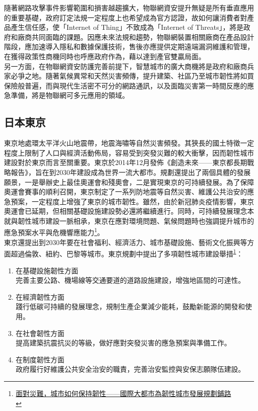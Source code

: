 \documentclass[a4paper,12pt]{article}
\begin{document}
\begin{enumerate}
隨著網路攻擊事件影響範圍和損害越趨擴大，物聯網資安提升無疑是所有垂直應用的重要基礎，政府訂定法規一定程度上也希望成為官方認證，故如何讓消費者對產品產生信任感，使「Internet of Thing」不致成為「Internet of Threats」，將是政府和廠商共同面臨的課題。因應未來法規和趨勢，物聯網裝置相關廠商在產品設計階段，應加速導入隱私和數據保護技術，售後亦應提供定期遠端漏洞維護和管理，在獲得政策性商機同時也呼應政府作為，藉以達到產官雙贏局面。\\

另一方面，在物聯網資安防護完善前提下，智慧城市的廣大商機將是政府和廠商兵家必爭之地。隨著氣候異常和天然災害頻傳，提升建築、社區乃至城市韌性將如買保險般普遍，而與現代生活密不可分的網路通訊，以及面臨災害第一時間反應的應急準備，將是物聯網可多元應用的領域。\\
\end{enumerate}

\subsection{日本東京}
\label{sec:org9cc0309}
東京地處環太平洋火山地震帶，地震海嘯等自然災害頻發。其狹長的國土特徵一定程度上限制了人口與經濟活動佈局，容易受到突發災難的較大衝擊，因而韌性城市建設對於東京而言至關重要。東京於2014年12月發佈《創造未來——東京都長期戰略報告》，旨在到2030年建設成為世界一流大都市。規劃還提出了兩個具體的發展願景，一是舉辦史上最佳奧運會和殘奧會，二是實現東京的可持續發展。為了保障奧運會賽事的順利召開，東京制定了一系列防地震等自然災害、維護公共治安的應急預案，一定程度上增強了東京的城市韌性。雖然，由於新冠肺炎疫情影響，東京奧運會已延期，但相關基礎設施建設勢必還將繼續進行。同時，可持續發展理念本就與韌性城市建設一脈相承，東京在應對環境問題、氣候問題時也強調提升城市的應急預案水平與危機響應能力\footnote{\href{https://news.gmw.cn/2020-04/09/content\_33725150.htm?from=search}{面對災難，城市如何保持韌性——國際大都市為韌性城市發展規劃鋪路}\\\label{orga14b87e}}。\\

東京還提出到2030年要在社會福利、經濟活力、城市基礎設施、藝術文化振興等方面超過倫敦、紐約、巴黎等城市。東京規劃中提出了多項韌性城市建設舉措\textsuperscript{\ref{orga14b87e}}：\\
\begin{enumerate}
\item 在基礎設施韌性方面\\
完善主要公路、機場線等交通要道的道路設施建設，增強地區間的可達性。\\
\item 在經濟韌性方面\\
踐行低碳可持續的發展理念，規制生產企業減少能耗，鼓勵新能源的開發和使用。\\
\item 在社會韌性方面\\
提高建築抗震抗災的等級，做好應對突發災害的應急預案與準備工作。\\
\item 在制度韌性方面\\
政府履行好維護公共安全治安的職責，完善治安監控與安保志願隊伍建設。\\
\end{enumerate}
\end{document}
